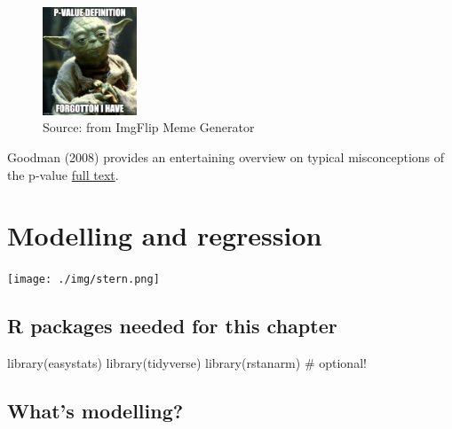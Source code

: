 \documentclass[
  letterpaper,
  DIV=11,
  numbers=noendperiod]{scrreprt}
\newenvironment{Shaded}{\begin{snugshade}}{\end{snugshade}}
\newcommand{\CommentTok}[1]{\textcolor[rgb]{0.37,0.37,0.37}{#1}}
\newcommand{\FunctionTok}[1]{\textcolor[rgb]{0.28,0.35,0.67}{#1}}
\newcommand{\NormalTok}[1]{\textcolor[rgb]{0.00,0.23,0.31}{#1}}
\theoremstyle{definition}
\theoremstyle{definition}
\theoremstyle{remark}
\begin{document}
\begin{figure}

{\centering \includegraphics[width=0.25\textwidth,height=\textheight]{./img/6m29tz.jpeg}

}

\caption{Source: from ImgFlip Meme Generator}

\end{figure}

Goodman (2008) provides an entertaining overview on typical
misconceptions of the p-value
\href{https://www.ohri.ca//newsroom/seminars/SeminarUploads/1829/Suggested\%20Reading\%20-\%20Nov\%203,\%202014.pdf}{full
text}.


\hypertarget{modelling-and-regression}{%
\chapter{Modelling and regression}\label{modelling-and-regression}}

\texttt{[image: ./img/stern.png]}

\hypertarget{r-packages-needed-for-this-chapter-1}{%
\section{R packages needed for this
chapter}\label{r-packages-needed-for-this-chapter-1}}

\begin{Shaded}
\begin{Highlighting}[]
\FunctionTok{library}\NormalTok{(easystats)}
\FunctionTok{library}\NormalTok{(tidyverse)}
\FunctionTok{library}\NormalTok{(rstanarm)  }\CommentTok{\# optional!}
\end{Highlighting}
\end{Shaded}

\hypertarget{whats-modelling}{%
\section{What's modelling?}\label{whats-modelling}}
\end{document}
